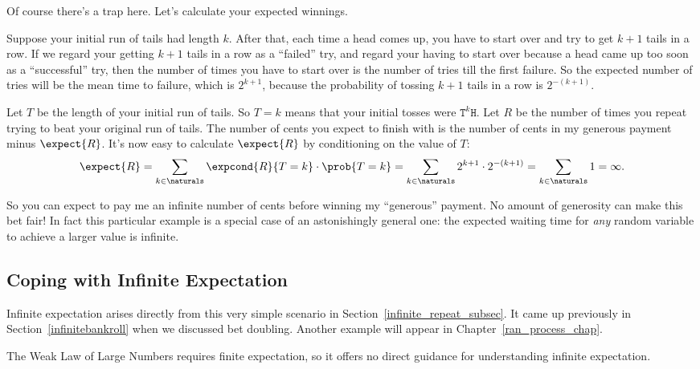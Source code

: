 Of course there's a trap here.  Let's calculate your expected
winnings.

Suppose your initial run of tails had length $k$.  After that, each
time a head comes up, you have to start over and try to get $k+1$ tails
in a row.  If we regard your getting $k+1$ tails in a row as a
``failed'' try, and regard your having to start over because a head
came up too soon as a ``successful'' try, then the number of times you
have to start over is the number of tries till the first failure.  So
the expected number of tries will be the mean time to failure, which is
$2^{k+1}$, because the probability of tossing $k+1$ tails in a row is
$2^{-(k+1)}$.

Let $T$ be the length of your initial run of tails.  So $T = k$ means
that your initial tosses were $\texttt{T}^k\texttt{H}$.  Let $R$ be
the number of times you repeat trying to beat your original run of
tails.  The number of cents you expect to finish with is the number of
cents in my generous payment minus $\expect{R}$.  It's now easy to
calculate $\expect{R}$ by conditioning on the value of $T$:
\[
\expect{R}
     = \sum_{k \in \naturals} \expcond{R}{T=k} \cdot \prob{T=k}
     = \sum_{k \in \naturals}  2^{k+1} \cdot 2^{-(k+1)}
     = \sum_{k \in \naturals} 1 = \infty.
\]

\iffalse
\begin{align*}
\expect{R}
    & = \sum_{k \in \naturals} \expcond{R}{T=k} \cdot \prob{T=k}\\
    & = \sum_{k \in \naturals}  2^{k+1} \cdot 2^{-(k+1)}\\
    & = \sum_{k \in \naturals} 1 = \infty.
\end{align*}
\fi

So you can expect to pay me an infinite number of cents before winning
my ``generous'' payment.  No amount of generosity can make this bet
fair!  In fact this particular example is a special case of an
astonishingly general one: \iffalse worked out in
Problem~\ref{PS_infinite_repeat_expectation}\fi the expected waiting
time for \emph{any} random variable to achieve a larger value is
infinite.

\begin{editingnotes}
\subsection{Coping with Infinite Expectation}

Infinite expectation arises directly from this very simple scenario in
Section~\ref{infinite_repeat_subsec}.  It came up previously in
Section~\ref{infinitebankroll} when we discussed bet doubling.
Another example will appear in Chapter~\ref{ran_process_chap}.

The Weak Law of Large Numbers requires finite expectation, so it
offers no direct guidance for understanding infinite expectation.
\end{editingnotes}



